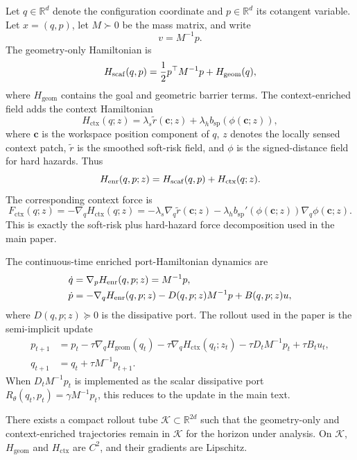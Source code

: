 Let \(q \in \mathbb R^d\) denote the configuration coordinate and \(p\in\mathbb R^d\)
its cotangent variable. Let \(x=(q,p)\), let \(M\succ 0\) be the mass matrix, and
write
\[
    v = M^{-1}p .
\]
The geometry-only Hamiltonian is
\[
    H_{\rm scaf}(q,p)
    =
    \frac12 p^\top M^{-1}p + H_{\mathrm{geom}}(q),
\]
where \(H_{\mathrm{geom}}\) contains the goal and geometric barrier terms. The context-enriched field
adds the context Hamiltonian
\[
    H_{\mathrm{ctx}}(q;z)
    =
    \lambda_s \widetilde r(\mathbf c;z)
    +
    \lambda_h b_{\mathrm{sp}}(\phi(\mathbf c;z)),
\]
where \(\mathbf c\) is the workspace position component of \(q\), \(z\) denotes the
locally sensed context patch, \(\widetilde r\) is the smoothed soft-risk field, and
\(\phi\) is the signed-distance field for hard hazards. Thus
\[
    H_{\rm enr}(q,p;z)
    =
    H_{\rm scaf}(q,p)+H_{\mathrm{ctx}}(q;z).
\]
The corresponding context force is
\[
    F_{\mathrm{ctx}}(q;z)
    =
    -\nabla_q H_{\mathrm{ctx}}(q;z)
    =
    -\lambda_s \nabla_q \widetilde r(\mathbf c;z)
    -
    \lambda_h b_{\mathrm{sp}}'(\phi(\mathbf c;z))\nabla_q \phi(\mathbf c;z).
\]
This is exactly the soft-risk plus hard-hazard force decomposition used in the main
paper.

The continuous-time enriched port-Hamiltonian dynamics are
\begin{align}
    \dot q &= \nabla_p H_{\rm enr}(q,p;z)=M^{-1}p, \label{eq:ct_q}\\
    \dot p &=
    -\nabla_q H_{\rm enr}(q,p;z)
    -
    D(q,p;z)M^{-1}p
    +
    B(q,p;z)u , \label{eq:ct_p}
\end{align}
where \(D(q,p;z)\succeq 0\) is the dissipative port. The rollout used in the paper is
the semi-implicit update
\begin{align}
    p_{t+1}
    &=
    p_t
    -\tau\nabla_q H_{\mathrm{geom}}(q_t)
    -\tau\nabla_q H_{\mathrm{ctx}}(q_t;z_t)
    -\tau D_tM^{-1}p_t
    +\tau B_tu_t, \label{eq:disc_p}\\
    q_{t+1}
    &=
    q_t+\tau M^{-1}p_{t+1}. \label{eq:disc_q}
\end{align}
When \(D_tM^{-1}p_t\) is implemented as the scalar dissipative port
\(R_\theta(q_t,p_t)=\gamma M^{-1}p_t\), this reduces to the update in the main text.

\begin{assumption}
\label{ass:regularity}
There exists a compact rollout tube \(\mathcal K\subset \mathbb R^{2d}\) such that
the geometry-only and context-enriched trajectories remain in \(\mathcal K\) for the horizon under
analysis. On \(\mathcal K\), \(H_{\mathrm{geom}}\) and \(H_{\mathrm{ctx}}\) are \(C^2\),
and their gradients are Lipschitz.
\end{assumption}

